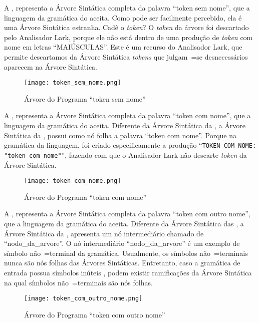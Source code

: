 A ,
representa a Árvore Sintática completa da palavra ``token sem nome'',
que a linguagem da gramática do  aceita.
Como pode ser facilmente percebido,
ela é uma Árvore Sintática estranha.
Cadê o \textit{token}?
O \textit{token} da árvore foi descartado pelo Analisador Lark,
porque ele não está dentro de uma produção de \textit{token} com nome em letras ``MAIÚSCULAS''.
Este é um recurso do Analisador Lark,
que permite descartamos da Árvore Sintática \textit{tokens} que julgam~=se desnecessários aparecem na Árvore Sintática.
\begin{figure}[H]
\caption{Árvore do Programa ``token sem nome''}
\label{Figure:ArvoresDosTokens1}
\centering
\texttt{[image: token\_sem\_nome.png]}
\end{figure}

A ,
representa a Árvore Sintática completa da palavra ``token com nome'',
que a linguagem da gramática do  aceita.
Diferente da Árvore Sintática da ,
a Árvore Sintática da ,
possui como nó folha a palavra ``token com nome''.
Porque na gramática da linguagem,
foi criado especificamente a produção ``\texttt{TOKEN_COM_NOME:
"token com nome"}'',
fazendo com que o Analisador Lark não descarte \textit{token} da Árvore Sintática.
\begin{figure}[H]
\caption{Árvore do Programa ``token com nome''}
\label{Figure:ArvoresDosTokens2}
\centering
\texttt{[image: token\_com\_nome.png]}
\end{figure}

A ,
representa a Árvore Sintática completa da palavra ``token com outro nome'',
que a linguagem da gramática do  aceita.
Diferente da Árvore Sintática das ,
a Árvore Sintática da ,
apresenta um nó intermediário chamado de ``nodo\_da\_arvore''.
O nó intermediário ``nodo\_da\_arvore'' é um exemplo de símbolo não~=terminal da gramática.
Usualmente,
os símbolos não~=terminais nunca são nós folhas das Árvores Sintáticas.
Entretanto,
caso a gramática de entrada possua símbolos inúteis \cite{hopcroftBook},
podem existir ramificações da Árvore Sintática na qual símbolos não~=terminais são nós folhas.
\begin{figure}[H]
\caption{Árvore do Programa ``token com outro nome''}
\label{Figure:ArvoresDosTokens3}
\centering
\texttt{[image: token\_com\_outro\_nome.png]}
\end{figure}

